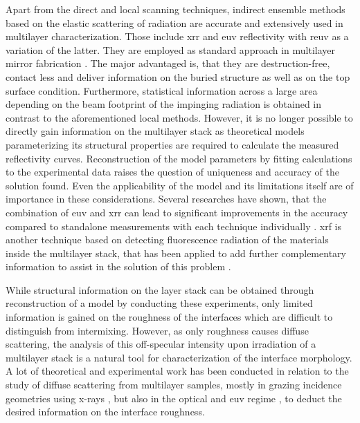 Apart from the direct and local scanning techniques, indirect ensemble methods based on the elastic scattering of radiation are accurate and extensively used in multilayer characterization. Those include \gls{xrr} and \gls{euv} reflectivity with \gls{reuv} as a variation of the latter. They are employed as standard approach in multilayer mirror fabrication \cite{lim_fabrication_2001, bajt_investigation_2001, braun_mo/si_2002}. The major advantaged is, that they are destruction-free, contact less and deliver information on the buried structure as well as on the top surface condition. Furthermore, statistical information across a large area depending on the beam footprint of the impinging radiation is obtained in contrast to the aforementioned local methods. However, it is no longer possible to directly gain information on the multilayer stack as theoretical models parameterizing its structural properties are required to calculate the measured reflectivity curves. Reconstruction of the model parameters by fitting calculations to the experimental data raises the question of uniqueness and accuracy of the solution found. Even the applicability of the model and its limitations itself are of importance in these considerations. Several researches have shown, that the combination of \gls{euv} and \gls{xrr} can lead to significant improvements in the accuracy compared to standalone measurements with each technique individually \cite{yakunin_combined_2014}. \Gls{xrf} is another technique based on detecting fluorescence radiation of the materials inside the multilayer stack, that has been applied to add further complementary information to assist in the solution of this problem \cite{kortright_standing_1987, kawamura_interface_1994, ghose_x-ray_2001}.

While structural information on the layer stack can be obtained through reconstruction of a model by conducting these experiments, only limited information is gained on the roughness of the interfaces which are difficult to distinguish from intermixing. However, as only roughness causes diffuse scattering, the analysis of this off-specular intensity upon irradiation of a multilayer stack is a natural tool for characterization of the interface morphology. A lot of theoretical and experimental work has been conducted in relation to the study of diffuse scattering from multilayer samples, mostly in grazing incidence geometries using x-rays \cite{mikulik_x-ray_1997, sinha_x-ray_1994, de_boer_x-ray_1995, de_boer_x-ray_1996}, but also in the optical and \gls{euv} regime \cite{amra_light_1993, amra_light_1994, elson_light_1980, elson_relationship_1983, schroder_angle-resolved_2011, schroder_spectral_2014}, to deduct the desired information on the interface roughness.

